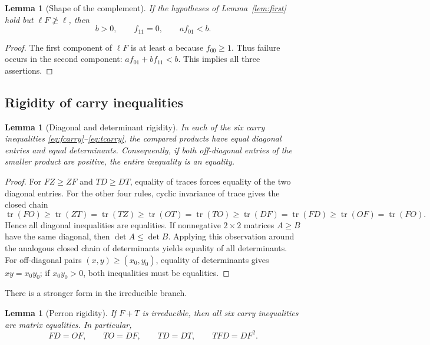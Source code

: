 \documentclass[11pt]{article}
\newtheorem{lemma}[theorem]{Lemma}
\theoremstyle{definition}
\begin{document}
\begin{lemma}[Shape of the complement]\label{lem:complement}
If the hypotheses of Lemma~\ref{lem:first} hold but $\ell F\not\ge\ell$,
then
\[
 b>0,\qquad f_{11}=0,\qquad af_{01}<b.
\]
\end{lemma}

\begin{proof}
The first component of $\ell F$ is at least $a$ because $f_{00}\ge1$.
Thus failure occurs in the second component:
$af_{01}+bf_{11}<b$.  This implies all three assertions.
\end{proof}

\subsection{Rigidity of carry inequalities}

\begin{lemma}[Diagonal and determinant rigidity]\label{lem:rigidity}
In each of the six carry inequalities
\eqref{eq:fcarry}--\eqref{eq:tcarry}, the compared products have equal
diagonal entries and equal determinants.  Consequently, if both
off-diagonal entries of the smaller product are positive, the entire
inequality is an equality.
\end{lemma}

\begin{proof}
For $FZ\ge ZF$ and $TD\ge DT$, equality of traces forces equality of the
two diagonal entries.  For the other four rules, cyclic invariance of trace
gives the closed chain
\[
 \operatorname{tr}(FO)\ge\operatorname{tr}(ZT)
 =\operatorname{tr}(TZ)\ge\operatorname{tr}(OT)
 =\operatorname{tr}(TO)\ge\operatorname{tr}(DF)
 =\operatorname{tr}(FD)\ge\operatorname{tr}(OF)
 =\operatorname{tr}(FO).
\]
Hence all diagonal inequalities are equalities.  If nonnegative
$2\times2$ matrices $A\ge B$ have the same diagonal, then
$\det A\le\det B$.  Applying this observation around the analogous closed
chain of determinants yields equality of all determinants.  For
off-diagonal pairs $(x,y)\ge(x_0,y_0)$, equality of determinants gives
$xy=x_0y_0$; if $x_0y_0>0$, both inequalities must be equalities.
\end{proof}

There is a stronger form in the irreducible branch.

\begin{lemma}[Perron rigidity]\label{lem:perronrigidity}
If $F+T$ is irreducible, then all six carry inequalities are matrix
equalities.  In particular,
\[
 FD=OF,\qquad TO=DF,\qquad TD=DT,\qquad TFD=DF^2.
\tag{K}
\]
\end{lemma}
\end{document}
